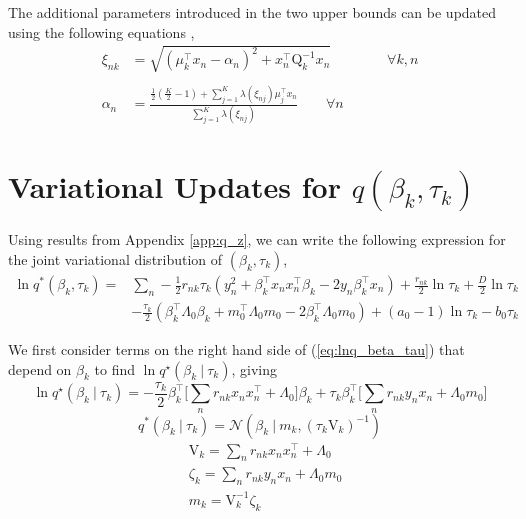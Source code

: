 \documentclass[twoside,11pt]{article}
\newcommand\given[1][]{\:#1\vert\:}
\newcommand{\transpose}[1]{#1^{\intercal}}
\begin{document}
The additional parameters introduced in the two upper bounds can be updated using the following equations \parencite{Depraetere:17},
\begin{align*}
    \xi_{nk} & = \sqrt{\left(\mu_k^{\intercal}x_n - \alpha_n \right)^2 + x_n^{\intercal} \mathrm{Q}_k^{-1} x_n} \qquad \qquad \forall k, n \\ \\
    \alpha_n & = \frac{\frac{1}{2}\left( \frac{K}{2} - 1\right) + \sum_{j = 1}^K \lambda \left( \xi_{nj} \right)\mu_j^{\intercal} x_n}{\sum_{j=1}^{K} \lambda \left( \xi_{nj}\right)} \qquad \forall n
\end{align*}


\section{Variational Updates for $q(\beta_k, \tau_k)$} \label{app:beta_tau}  
Using results from Appendix \ref{app:q_z}, we can write the following expression for the joint variational distribution of $(\beta_k, \tau_k)$, 
\begin{equation} \label{eq:lnq_beta_tau}
\begin{split}
	\ln q^{*}(\beta_k, \tau_k) = & \sum_{n} -\frac{1}{2} r_{nk} \tau_k \left( y_n^2 + \transpose{\beta_k} x_n \transpose{x_n} \beta_k - 2y_n \transpose{\beta_k} x_n \right) + \frac{r_{nk}}{2} \ln \tau_k + \frac{D}{2} \ln \tau_k \\
	& - \frac{\tau_k}{2} \left( \transpose{\beta_k} \Lambda_0 \beta_k + \transpose{m_0} \Lambda_0 m_0 - 2\transpose{\beta_k}\Lambda_0m_0\right) + (a_0 - 1) \ln \tau_k - b_0 \tau_k
\end{split}
\end{equation}

We first consider terms on the right hand side of (\ref{eq:lnq_beta_tau}) that depend on $\beta_k$ to find $\ln q^{\star}(\beta_k \given \tau_k)$, giving
\begin{equation} \label{eq:lnq_beta}
	\ln q^{\star}(\beta_k \given \tau_k) = -\frac{\tau_k}{2} \transpose{\beta_k} \Big[ \sum_{n}r_{nk} x_n \transpose{x_n} + \Lambda_0 \Big] \beta_k + \tau_k \transpose{\beta_k} \Big[ \sum_{n} r_{nk}y_n x_n + \Lambda_0 m_0 \Big]
\end{equation}
\begin{equation} \label{q_beta}
	q^{*}(\beta_k \given \tau_k) = \mathcal{N}\left(\beta_k \given m_k, (\tau_k \mathrm{V}_k)^{-1} \right)
\end{equation}
\begin{equation} \label{eq:beta_params}
\begin{split}
    & \mathrm{V}_k = \sum_{n} r_{nk} x_n \transpose{x_n} + \Lambda_0 \\
 	& \zeta_k = \sum_{n} r_{nk} y_n x_n + \Lambda_0 m_0 \\
	& m_k = \mathrm{V}_k^{-1}  \zeta_k 
\end{split}
\end{equation}
\end{document}
